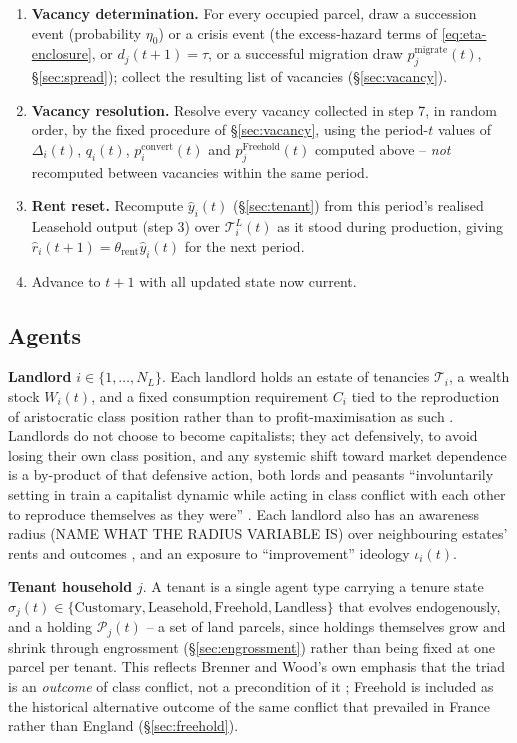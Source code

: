 \documentclass[11pt,english]{article}
\begin{document}
\begin{enumerate}
\item \textbf{Vacancy determination.} For every occupied parcel, draw a succession event (probability $\eta_0$) or a crisis event (the excess-hazard terms of \eqref{eq:eta-enclosure}, or $d_j(t+1)=\tau$, or a successful migration draw $p_j^{\text{migrate}}(t)$, \S\ref{sec:spread}); collect the resulting list of vacancies (\S\ref{sec:vacancy}).
\item \textbf{Vacancy resolution.} Resolve every vacancy collected in step 7, in random order, by the fixed procedure of \S\ref{sec:vacancy}, using the period-$t$ values of $\Delta_i(t)$, $q_i(t)$, $p_i^{\text{convert}}(t)$ and $p_j^{\text{Freehold}}(t)$ computed above -- \emph{not} recomputed between vacancies within the same period.
\item \textbf{Rent reset.} Recompute $\hat y_i(t)$ (\S\ref{sec:tenant}) from this period's realised Leasehold output (step 3) over $\mathcal{T}_i^{L}(t)$ as it stood during production, giving $\hat r_i(t+1)=\theta_{\text{rent}}\hat y_i(t)$ for the next period.
\item Advance to $t+1$ with all updated state now current.
\end{enumerate}

\subsection{Agents}
\label{sec:agents}

\textbf{Landlord} $i \in \{1,\dots,N_L\}$. Each landlord holds an estate of tenancies $\mathcal{T}_i$, a wealth stock $W_i(t)$, and a fixed consumption requirement $C_i$ tied to the reproduction of aristocratic class position rather than to profit-maximisation as such \cite[p.31]{brenner1976agrarian}. Landlords do not choose to become capitalists; they act defensively, to avoid losing their own class position, and any systemic shift toward market dependence is a by-product of that defensive action, both lords and peasants ``involuntarily setting in train a capitalist dynamic while acting in class conflict with each other to reproduce themselves as they were'' \cite[p.52]{wood2002origin}. Each landlord also has an awareness radius (NAME WHAT THE RADIUS VARIABLE IS) over neighbouring estates' rents and outcomes \cite[p.100-101]{wood2002origin}, and an exposure to ``improvement'' ideology $\iota_i(t)$.

\textbf{Tenant household} $j$. A tenant is a single agent type carrying a tenure state $\sigma_j(t) \in \{\text{Customary}, \text{Leasehold}, \text{Freehold}, \text{Landless}\}$ that evolves endogenously, and a holding $\mathcal{P}_j(t)$ -- a set of land parcels, since holdings themselves grow and shrink through engrossment (\S\ref{sec:engrossment}) rather than being fixed at one parcel per tenant. This reflects Brenner and Wood's own emphasis that the triad is an \emph{outcome} of class conflict, not a precondition of it \cite[p.63]{brenner1976agrarian}; Freehold is included as the historical alternative outcome of the same conflict that prevailed in France rather than England (\S\ref{sec:freehold}).
\end{document}
